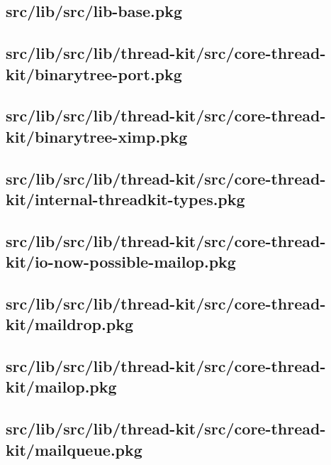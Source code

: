 \subsection{src/lib/src/lib-base.pkg}


\subsection{src/lib/src/lib/thread-kit/src/core-thread-kit/binarytree-port.pkg}


\subsection{src/lib/src/lib/thread-kit/src/core-thread-kit/binarytree-ximp.pkg}


\subsection{src/lib/src/lib/thread-kit/src/core-thread-kit/internal-threadkit-types.pkg}


\subsection{src/lib/src/lib/thread-kit/src/core-thread-kit/io-now-possible-mailop.pkg}


\subsection{src/lib/src/lib/thread-kit/src/core-thread-kit/maildrop.pkg}


\subsection{src/lib/src/lib/thread-kit/src/core-thread-kit/mailop.pkg}


\subsection{src/lib/src/lib/thread-kit/src/core-thread-kit/mailqueue.pkg}


